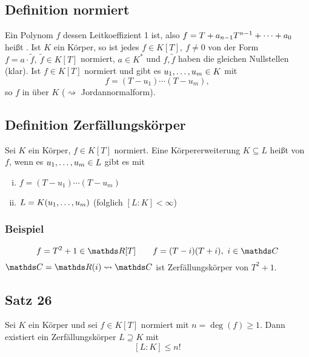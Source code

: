 \subsection{Definition normiert}
\label{sub:def_normiert}
Ein Polynom $f$ dessen Leitkoeffizient 1 ist, also $f=T+a_{n-1}T^{n-1}+ \dots +a_0$ heißt .
Ist $K$ ein Körper, so ist jedes $f\in K[T],~f\neq 0$ von der Form $f=a\cdot \tilde{f},~\tilde{f}\in K[T]$ normiert, $a\in K^*$ und $f,\tilde{f}$ haben die gleichen Nullstellen (klar).
Ist $f\in K[T]$ normiert und gibt es $u_1, \dots ,u_m\in K$ mit
\[
f=(T-u_1)\cdots(T-u_m),
\]
so  $f$ in  über $K$ ($\rightsquigarrow$ Jordannormalform).

\subsection{Definition Zerfällungskörper}
\label{sub:def_zerfaellungskoerper}
Sei $K$ ein Körper, $f\in K[T]$ normiert.
Eine Körpererweiterung $K\subseteq L$ heißt  von $f$, wenn es $u_1, \dots ,u_m\in L$ gibt es mit
\begin{enumerate}[(i)]
	\item $f=(T-u_1)\cdots(T-u_m)$
	\item $L=K(u_1, \dots ,u_m)$ (folglich $[L:K]<\infty$)
\end{enumerate}

\subsubsection*{Beispiel}
\[
f=T^2+1\in \R[T]\qquad f=(T-i)(T+i),~i\in \C
\]
$\C=\R(i)\rightsquigarrow \C$ ist Zerfällungskörper von $T^2+1$.

\subsection{Satz 26}
\label{sub:satz_26}
Sei $K$ ein Körper und sei $f\in K[T]$ normiert mit $n=\deg(f)\ge 1$.
Dann existiert ein Zerfällungskörper $L\supseteq K$ mit 
\[
[L:K]\le n!
\]

